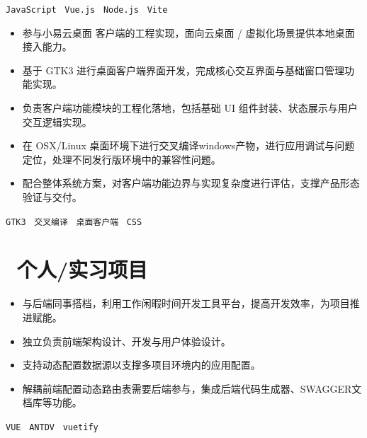 \documentclass{resume}
\begin{document}
\vspace{0.3em}
\texttt{JavaScript} \textperiodcentered\
\texttt{Vue.js} \textperiodcentered\
\texttt{Node.js} \textperiodcentered\
\texttt{Vite}



\role{客户端开发 / 工程实现}{}

\begin{itemize}
  \item 参与小易云桌面  客户端的工程实现，面向云桌面 / 虚拟化场景提供本地桌面接入能力。
  \item 基于 GTK3 进行桌面客户端界面开发，完成核心交互界面与基础窗口管理功能实现。
  \item 负责客户端功能模块的工程化落地，包括基础 UI 组件封装、状态展示与用户交互逻辑实现。
  \item 在 OSX/Linux 桌面环境下进行交叉编译windows产物，进行应用调试与问题定位，处理不同发行版环境中的兼容性问题。
  \item 配合整体系统方案，对客户端功能边界与实现复杂度进行评估，支撑产品形态验证与交付。
\end{itemize}

\vspace{0.3em}
\texttt{GTK3} \textperiodcentered\
\texttt{交叉编译} \textperiodcentered\
\texttt{桌面客户端} \textperiodcentered\
\texttt{CSS}

\section{\faCode\ 个人/实习项目}


\begin{itemize}
  \item 与后端同事搭档，利用工作闲暇时间开发工具平台，提高开发效率，为项目推进赋能。
  \item 独立负责前端架构设计、开发与用户体验设计。
  \item 支持动态配置数据源以支撑多项目环境内的应用配置。
  \item 解耦前端配置动态路由表需要后端参与，集成后端代码生成器、SWAGGER文档库等功能。
\end{itemize}

\vspace{0.3em}
\texttt{VUE} \textperiodcentered\
\texttt{ANTDV} \textperiodcentered\
\texttt{vuetify}
\end{document}
